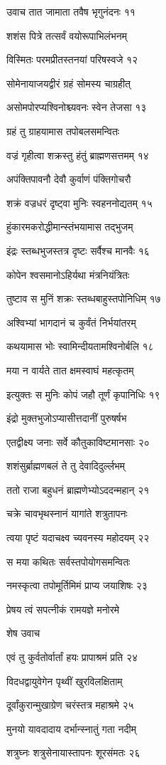 उवाच तात जामाता तवैष भृगुनंदनः ११

शशंस पित्रे तत्सर्वं वयोरूपाभिलंभनम्

विस्मितः परमप्रीतस्तनयां परिषस्वजे १२

सोमेनायाजयद्वीरं ग्रहं सोमस्य चाग्रहीत्

असोमपोरप्यश्विनोश्च्यवनः स्वेन तेजसा १३

ग्रहं तु ग्राहयामास तपोबलसमन्वितः

वज्रं गृहीत्वा शक्रस्तु हंतुं ब्राह्मणसत्तमम् १४

अपंक्तिपावनौ देवौ कुर्वाणं पंक्तिगोचरौ

शक्रं वज्रधरं दृष्ट्वा मुनिः स्वहननोद्यतम् १५

हुंकारमकरोद्धीमान्स्तंभयामास तद्भुजम्

इंद्रः स्तब्धभुजस्तत्र दृष्टः सर्वैश्च मानवैः १६

कोपेन श्वसमानोऽहिर्यथा मंत्रनियंत्रितः

तुष्टाव स मुनिं शक्रः स्तब्धबाहुस्तपोनिधिम् १७

अश्विभ्यां भागदानं च कुर्वंतं निर्भयांतरम्

कथयामास भोः स्वामिन्दीयतामश्विनोर्बलि १८

मया न वार्यते तात क्षमस्वाघं महत्कृतम्

इत्युक्तः स मुनिः कोपं जहौ तूर्णं कृपानिधिः १९

इंद्रो मुक्तभुजोऽप्यासीत्तदानीं पुरुषर्षभ

एतद्वीक्ष्य जनाः सर्वे कौतुकाविष्टमानसाः २०

शशंसुर्ब्राह्मणबलं ते तु देवादिदुर्ल्लभम्

ततो राजा बहुधनं ब्राह्मणेभ्योऽददन्महान् २१

चक्रे चावभृथस्नानं यागांते शत्रुतापनः

त्वया पृष्टं यदाचक्ष्व च्यवनस्य महोदयम् २२

स मया कथितः सर्वस्तपोयोगसमन्वितः

नमस्कृत्वा तपोमूर्तिमिमं प्राप्य जयाशिषः २३

प्रेषय त्वं सपत्नीकं रामयज्ञे मनोरमे

शेष उवाच

एवं तु कुर्वतोर्वार्तां हयः प्रापाश्रमं प्रति २४

विदधद्वायुवेगेन पृथ्वीं खुरविलक्षिताम्

दूर्वांकुरान्मुखाग्रेण चरंस्तत्र महाश्रमे २५

मुनयो यावदादाय दर्भान्स्नातुं गता नदीम्

शत्रुघ्नः शत्रुसेनायास्तापनः शूरसंमतः २६

